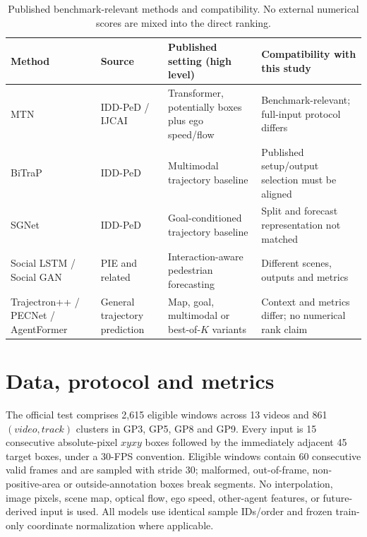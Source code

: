 \documentclass[11pt]{article}
\begin{document}
\begin{table}[H]\centering\scriptsize
\caption{Published benchmark-relevant methods and compatibility. No external numerical scores are mixed into the direct ranking.}\begin{tabularx}{\linewidth}{p{2.0cm}p{2.15cm}p{4.1cm}X}
\toprule Method & Source & Published setting (high level) & Compatibility with this study \\
\midrule MTN & IDD-PeD / IJCAI & Transformer, potentially boxes plus ego speed/flow & Benchmark-relevant; full-input protocol differs \\
BiTraP & IDD-PeD & Multimodal trajectory baseline & Published setup/output selection must be aligned \\
SGNet & IDD-PeD & Goal-conditioned trajectory baseline & Split and forecast representation not matched \\
Social LSTM / Social GAN & PIE and related & Interaction-aware pedestrian forecasting & Different scenes, outputs and metrics \\
Trajectron++ / PECNet / AgentFormer & General trajectory prediction & Map, goal, multimodal or best-of-$K$ variants & Context and metrics differ; no numerical rank claim \\
\bottomrule\end{tabularx}\label{tab:published}
\end{table}

\section{Data, protocol and metrics}
The official test comprises 2,615 eligible windows across 13 videos and 861 $(video,track)$ clusters in GP3, GP5, GP8 and GP9. Every input is 15 consecutive absolute-pixel $xyxy$ boxes followed by the immediately adjacent 45 target boxes, under a 30-FPS convention. Eligible windows contain 60 consecutive valid frames and are sampled with stride 30; malformed, out-of-frame, non-positive-area or outside-annotation boxes break segments. No interpolation, image pixels, scene map, optical flow, ego speed, other-agent features, or future-derived input is used. All models use identical sample IDs/order and frozen train-only coordinate normalization where applicable.
\end{document}
